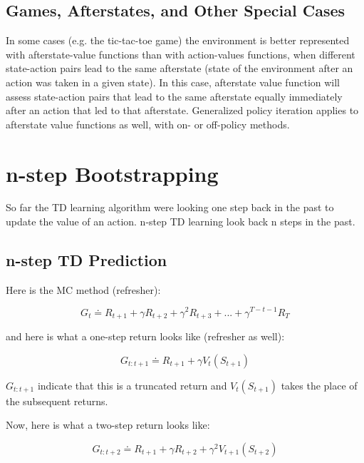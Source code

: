 \documentclass[11pt]{article}
\begin{document}
\subsection{Games, Afterstates, and Other Special Cases}
\label{sec:org1209166}

In some cases (e.g. the tic-tac-toe game) the environment is better represented
with afterstate-value functions than with action-values functions, when
different state-action pairs lead to the same afterstate (state of the
environment after an action was taken in a given state). In this case,
afterstate value function will assess state-action pairs that lead to the same
afterstate equally immediately after an action that led to that afterstate.
Generalized policy iteration applies to afterstate value functions as well, with
on- or off-policy methods.

\section{n-step Bootstrapping}
\label{sec:orgc53d5d1}

So far the TD learning algorithm were looking one step back in the past to
update the value of an action. n-step TD learning look back n steps in the past.

\subsection{n-step TD Prediction}
\label{sec:orgf43e67f}

Here is the MC method (refresher):

\begin{equation}
G_t \doteq R_{t+1} + \gamma R_{t+2} + \gamma^2 R_{t+3} + {...} + \gamma^{T-t-1} R_T
\end{equation}

and here is what a one-step return looks like (refresher as well):

\begin{equation}
G_{t:t+1} \doteq R_{t+1} + \gamma V_t(S_{t+1})
\end{equation}

\(G_{t:t+1}\) indicate that this is a truncated return and \(V_t(S_{t+1})\) takes
the place of the subsequent returns.

Now, here is what a two-step return looks like:

\begin{equation}
G_{t:t+2} \doteq R_{t+1} + \gamma R_{t+2} + \gamma^2 V_{t+1}(S_{t+2})
\end{equation}
\end{document}
